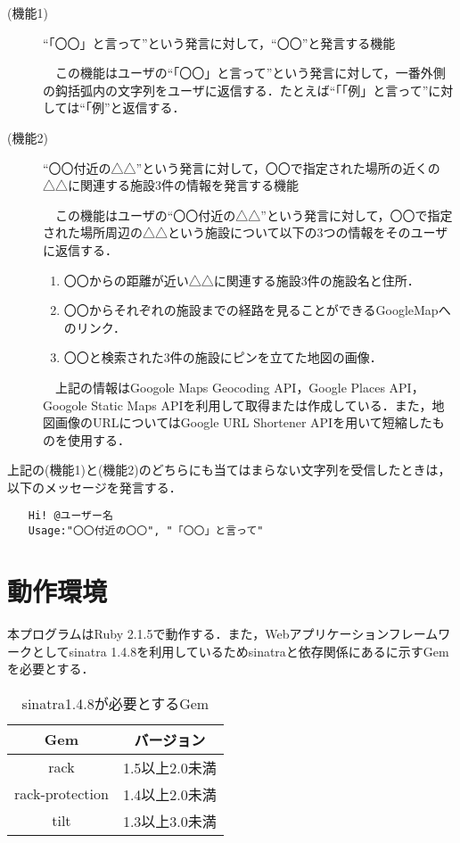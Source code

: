 \documentclass[fleqn, 14pt]{extarticlej}
\begin{document}
\begin{description}
\item[(機能1)]``「〇〇」と言って''という発言に対して，``〇〇''と発言する機能
  
  　この機能はユーザの``「〇〇」と言って''という発言に対して，一番外側の鈎括弧内の文字列をユーザに返信する．たとえば``「「例」と言って''に対しては``「例''と返信する．
\item[(機能2)]``〇〇付近の△△''という発言に対して，〇〇で指定された場所の近くの△△に関連する施設3件の情報を発言する機能
  
  　この機能はユーザの``〇〇付近の△△''という発言に対して，〇〇で指定された場所周辺の△△という施設について以下の3つの情報をそのユーザに返信する．

\begin{enumerate}
  \item 〇〇からの距離が近い△△に関連する施設3件の施設名と住所．
  \item 〇〇からそれぞれの施設までの経路を見ることができるGoogleMapへのリンク．
  \item 〇〇と検索された3件の施設にピンを立てた地図の画像． 
\end{enumerate}

　上記の情報はGoogole Maps Geocoding API\cite{GoogleGeocodingAPI}，Google Places API\cite{GooglePlacesAPI}，Googole Static Maps API\cite{GoogleStaticMapsAPI}を利用して取得または作成している．また，地図画像のURLについてはGoogle URL Shortener API\cite{GoogleURLShortenerAPI}を用いて短縮したものを使用する．

\end{description}

上記の(機能1)と(機能2)のどちらにも当てはまらない文字列を受信したときは，以下のメッセージを発言する．

\begin{verbatim}
　　Hi! @ユーザー名
　　Usage:"〇〇付近の〇〇", "「〇〇」と言って"
\end{verbatim}

\section{動作環境}
本プログラムはRuby 2.1.5で動作する．また，Webアプリケーションフレームワークとしてsinatra 1.4.8を利用しているためsinatraと依存関係にあるに示すGemを必要とする．


\begin{table}[t]
  \begin{center}
    \caption{sinatra1.4.8が必要とするGem}
    \label{tab:sinatra_dependent}
    \begin{tabular}{|c|c|} \hline
      Gem & バージョン \\ \hline \hline
      rack & 1.5以上2.0未満 \\
      rack-protection & 1.4以上2.0未満 \\
      tilt & 1.3以上3.0未満 \\ \hline
    \end{tabular}
  \end{center}
\end{table}
\end{document}

